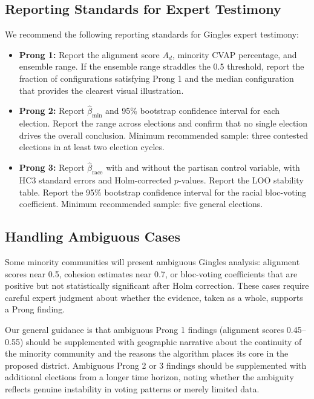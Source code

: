 \subsection{Reporting Standards for Expert Testimony}

We recommend the following reporting standards for Gingles expert testimony:

\begin{itemize}
  \item \textbf{Prong 1:} Report the alignment score $A_d$, minority CVAP
    percentage, and ensemble range.  If the ensemble range straddles the
    0.5 threshold, report the fraction of configurations satisfying Prong 1
    and the median configuration that provides the clearest visual
    illustration.

  \item \textbf{Prong 2:} Report $\hat{\beta}_{\text{min}}$ and 95\%
    bootstrap confidence interval for each election.  Report the range
    across elections and confirm that no single election drives the overall
    conclusion.  Minimum recommended sample: three contested elections in
    at least two election cycles.

  \item \textbf{Prong 3:} Report $\hat{\beta}_{\text{race}}$ with and without
    the partisan control variable, with HC3 standard errors and Holm-corrected
    $p$-values.  Report the LOO stability table.  Report the 95\% bootstrap
    confidence interval for the racial bloc-voting coefficient.  Minimum
    recommended sample: five general elections.
\end{itemize}

\subsection{Handling Ambiguous Cases}

Some minority communities will present ambiguous Gingles analysis: alignment
scores near 0.5, cohesion estimates near 0.7, or bloc-voting coefficients
that are positive but not statistically significant after Holm correction.
These cases require careful expert judgment about whether the evidence, taken
as a whole, supports a Prong finding.

Our general guidance is that ambiguous Prong 1 findings (alignment scores
0.45--0.55) should be supplemented with geographic narrative about the
continuity of the minority community and the reasons the algorithm places
its core in the proposed district.  Ambiguous Prong 2 or 3 findings should
be supplemented with additional elections from a longer time horizon,
noting whether the ambiguity reflects genuine instability in voting patterns
or merely limited data.
